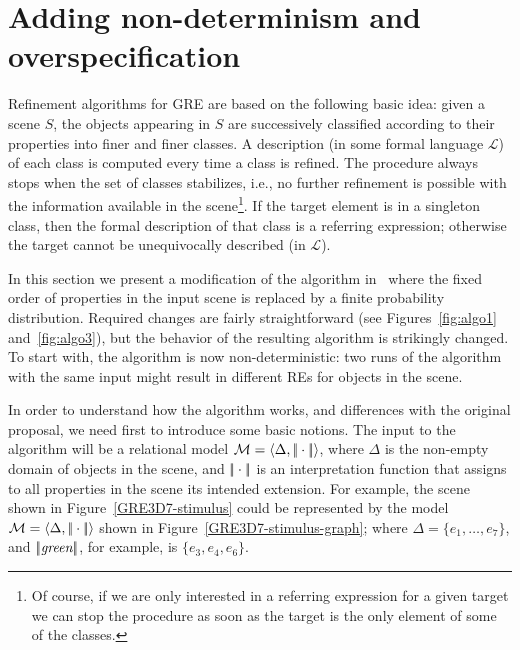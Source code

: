 \section{Adding non-determinism and overspecification} \label{sec:algorithm}

Refinement algorithms for GRE are based on the following basic idea: given a 
scene $S$, the objects appearing in $S$ are successively classified according
to their properties into finer and finer classes. A description (in some formal language $\mathcal{L}$) of each 
class is computed every time a class is refined. The procedure always stops when the 
set of classes stabilizes, i.e., no further refinement is possible with the information 
available in the scene\footnote{Of course, if we are only interested in a referring expression for 
a given target we can stop the procedure as soon as the target is the only element of some of the classes.}.  If the target element is in a singleton class, then the formal description of that class is a referring expression; otherwise the 
target cannot be unequivocally described (in $\mathcal{L}$).  

In this section we present a modification of the algorithm in~\cite{arec2:2008:Areces} where the fixed order of properties in the 
input scene is replaced by a finite probability distribution. Required changes
are fairly straightforward (see Figures~\ref{fig:algo1} and~\ref{fig:algo3}), but 
the behavior of the resulting algorithm is strikingly changed. To start with, the 
algorithm is now non-deterministic: two runs of the algorithm with the same 
input might result in different REs for objects in the scene.

In order to understand how the algorithm works, and differences with the original proposal, we need first to introduce some 
basic notions. The input to the algorithm will be a relational model $\mathcal{M} = \langle \Delta, |\!|\cdot|\!| \rangle$,
where $\Delta$ is the non-empty domain of objects in the scene, and $|\!|\cdot|\!|$ is an 
interpretation function that assigns to all properties in the scene its intended extension.  For example, 
the scene shown in Figure~\ref{GRE3D7-stimulus} could be represented by the model $\mathcal{M}=\langle \Delta,|\!|\cdot|\!| \rangle$ shown in Figure~\ref{GRE3D7-stimulus-graph}; where $\Delta = \{e_1,\ldots,e_7\}$, and $|\!|\emph{green}|\!|$, for example, is $\{e_3,e_4,e_6\}$.

\newcommand{\nBlue}{\mathit{blue}\xspace}
\newcommand{\nGreen}{\mathit{green}\xspace}
\newcommand{\nSmall}{\mathit{small}\xspace}
\newcommand{\nBig}{\mathit{big}\xspace}
\newcommand{\nBall}{\mathit{ball}\xspace}
\newcommand{\nCube}{\mathit{cube}\xspace}
\newcommand{\nOntop}{\mathit{ontop}\xspace}
\newcommand{\nTop}{\mathit{top}\xspace}
\newcommand{\nBelow}{\mathit{below}\xspace}
\newcommand{\nRightof}{\mathit{rightof}\xspace}
\newcommand{\nLeftof}{\mathit{leftof}\xspace}
\newcommand{\nLeft}{\mathit{left}\xspace}

